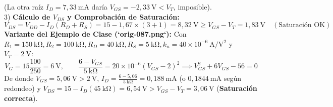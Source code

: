 \begin{ejercicio}
\begin{equation}
\end{equation}
(La otra raíz $I_D = 7{,}33\ \si{\milli\ampere}$ daría $V_{GS} = -2{,}33\ \si{\volt} < V_T$, imposible).\\[3pt]
3) \textbf{Cálculo de $V_{DS}$ y Comprobación de Saturación:}
\begin{equation}
    V_{DS} = V_{DD} - I_D(R_D + R_S) = 15 - 1{,}67 \times (3 + 1) = 8{,}32\ \si{\volt} \ge V_{GS} - V_T = 1{,}83\ \si{\volt} \quad (\text{Saturación OK})
\end{equation}
\textbf{Variante del Ejemplo de Clase (`orig-087.png`):} Con $R_1 = 150\ \si{\kilo\ohm}, R_2 = 100\ \si{\kilo\ohm}, R_D = 40\ \si{\kilo\ohm}, R_S = 5\ \si{\kilo\ohm}, k_n = 40 \times 10^{-6}\ \si{\ampere\per\volt\squared}$ y $V_T = 2\ \si{\volt}$:
\begin{equation}
    V_G = 15 \frac{100}{250} = 6\ \si{\volt}, \qquad \frac{6 - V_{GS}}{5\ \si{\kilo\ohm}} = 20 \times 10^{-6} (V_{GS} - 2)^2 \implies V_{GS}^2 + 6 V_{GS} - 56 = 0
\end{equation}
De donde $V_{GS} = 5{,}06\ \si{\volt} > 2\ \si{\volt}$, $I_D = \frac{6 - 5{,}06}{5\ \si{\kilo\ohm}} = 0{,}188\ \si{\milli\ampere}$ (o $0{,}1844\ \si{\milli\ampere}$ según redondeo) y $V_{DS} = 15 - I_D(45\ \si{\kilo\ohm}) = 6{,}54\ \si{\volt} > V_{GS} - V_T = 3{,}06\ \si{\volt}$ (\textbf{Saturación correcta}).
\end{ejercicio}

